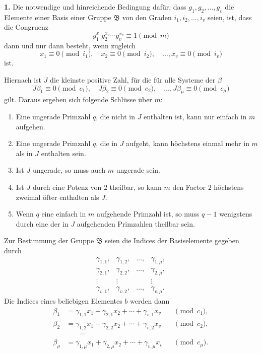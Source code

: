 \documentclass[11pt]{article}
\providecommand{\grpB}{\mathfrak B}
\begin{document}
\medskip
\noindent\textbf{1.} Die notwendige und hinreichende Bedingung dafür, dass $g_1,g_2,
\ldots,g_v$ die Elemente einer Basis einer Gruppe $\grpB$ von den Graden $i_1,i_2,
\ldots,i_v$ seien, ist, dass die Congruenz
\begin{equation}
 g_1^{x_1}g_2^{x_2}\cdots g_v^{x_v}\equiv1\pmod m
\tag{4}
\end{equation}
dann und nur dann besteht, wenn zugleich
\begin{equation}
 x_1\equiv0\pmod {i_1},\quad
 x_2\equiv0\pmod {i_2},\quad\ldots,
 x_v\equiv0\pmod {i_v}
\tag{5}
\end{equation}
ist.

Hiernach ist $J$ die kleinste positive Zahl, für die für alle Systeme der $\beta$
\begin{equation}
 J\beta_1\equiv0\pmod {c_1},\quad
 J\beta_2\equiv0\pmod {c_2},\quad\ldots,
 J\beta_\mu\equiv0\pmod {c_\mu}
\tag{6}
\end{equation}
gilt. Daraus ergeben sich folgende Schlüsse über $m$:

\begin{enumerate}[label=\alph*)]
\item Eine ungerade Primzahl $q$, die nicht in $J$ enthalten ist, kann nur einfach in $m$ aufgehen.
\item Eine ungerade Primzahl $q$, die in $J$ aufgeht, kann höchstens einmal mehr in $m$ als in $J$ enthalten sein.
\item Ist $J$ ungerade, so muss auch $m$ ungerade sein.
\item Ist $J$ durch eine Potenz von $2$ theilbar, so kann $m$ den Factor $2$ höchstens zweimal öfter enthalten als $J$.
\item Wenn $q$ eine einfach in $m$ aufgehende Primzahl ist, so muss $q-1$ wenigstens durch eine der in $J$ aufgehenden Primzahlen theilbar sein.
\end{enumerate}

Zur Bestimmung der Gruppe $\grpB$ seien die Indices der Basiselemente gegeben durch
\[
\begin{array}{cccc}
 \gamma_{1,1},&\gamma_{1,2},&\ldots,&\gamma_{1,\mu},\\
 \gamma_{2,1},&\gamma_{2,2},&\ldots,&\gamma_{2,\mu},\\
 \vdots&\vdots&&\vdots\\
 \gamma_{v,1},&\gamma_{v,2},&\ldots,&\gamma_{v,\mu}.
\end{array}
\]
Die Indices eines beliebigen Elementes $b$ werden dann
\begin{equation}
\begin{aligned}
 \beta_1&=\gamma_{1,1}x_1+\gamma_{2,1}x_2+\cdots+\gamma_{v,1}x_v&&\pmod {c_1},\\
 \beta_2&=\gamma_{1,2}x_1+\gamma_{2,2}x_2+\cdots+\gamma_{v,2}x_v&&\pmod {c_2},\\
 &\hspace{2em}\cdots\\
 \beta_\mu&=\gamma_{1,\mu}x_1+\gamma_{2,\mu}x_2+\cdots+\gamma_{v,\mu}x_v&&\pmod {c_\mu}.
\end{aligned}
\tag{8}
\end{equation}
\end{document}
